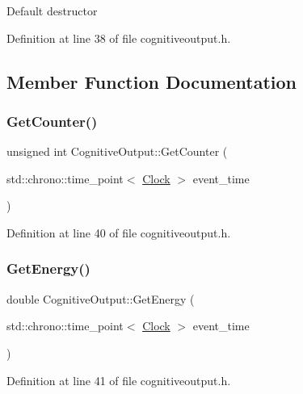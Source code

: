 Default destructor 

Definition at line 38 of file cognitiveoutput.\+h.



\subsection{Member Function Documentation}
\mbox{\label{class_cognitive_output_a73efe6441491eb54df2f4dbd78b3903e}} 
\subsubsection{\texorpdfstring{Get\+Counter()}{GetCounter()}}
{\footnotesize\ttfamily unsigned int Cognitive\+Output\+::\+Get\+Counter (\begin{DoxyParamCaption}\item[{std\+::chrono\+::time\+\_\+point$<$ \hyperlink{universe_8h_a0ef8d951d1ca5ab3cfaf7ab4c7a6fd80}{Clock} $>$}]{event\+\_\+time }\end{DoxyParamCaption})\hspace{0.3cm}{\ttfamily [inline]}}



Definition at line 40 of file cognitiveoutput.\+h.

\mbox{\label{class_cognitive_output_abb923045db565ecdbac431469217cebf}} 
\subsubsection{\texorpdfstring{Get\+Energy()}{GetEnergy()}}
{\footnotesize\ttfamily double Cognitive\+Output\+::\+Get\+Energy (\begin{DoxyParamCaption}\item[{std\+::chrono\+::time\+\_\+point$<$ \hyperlink{universe_8h_a0ef8d951d1ca5ab3cfaf7ab4c7a6fd80}{Clock} $>$}]{event\+\_\+time }\end{DoxyParamCaption})\hspace{0.3cm}{\ttfamily [inline]}}



Definition at line 41 of file cognitiveoutput.\+h.

